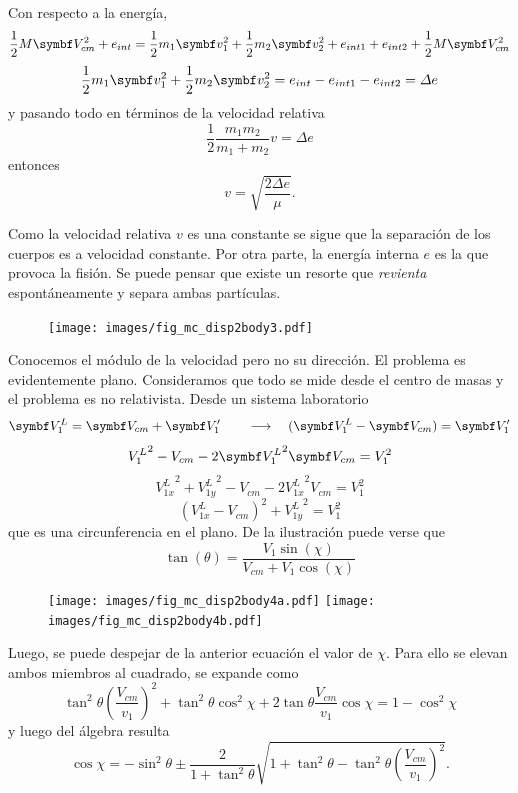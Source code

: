 \documentclass[10pt,oneside]{CBFT_book}
\begin{document}
Con respecto a la energía,
\[
	\frac{1}{2} M \vb{V}_{cm}^2 + e_{int} = \frac{1}{2} m_1 \vb{v}_1^2 + \frac{1}{2} m_2 \vb{v}_2^2
						+ e_{int 1 } + e_{int 2} + \frac{1}{2} M \vb{V}_{cm}^2
\]
\[
	\frac{1}{2} m_1 \vb{v}_1^2 + \frac{1}{2} m_2 \vb{v}_2^2 = e_{int} - e_{int 1 } - e_{int 2} = \Delta e
\]
y pasando todo en términos de la velocidad relativa
\[
	 \frac{1}{2} \frac{m_1 m_2}{ m_1 + m_2 } v = \Delta e
\]
entonces 
\[
	v = \sqrt{\frac{ 2 \Delta e}{ \mu } }.
\]

Como la velocidad relativa $v$ es una constante se sigue que la separación de los cuerpos es a
velocidad constante.
Por otra parte, la energía interna $e$ es la que provoca la fisión. Se puede pensar que existe un
resorte que {\it revienta} espontáneamente y separa ambas partículas.

\begin{figure}[htb]
	\begin{center}
	\texttt{[image: images/fig\_mc\_disp2body3.pdf]}	 
	\end{center}
	\caption{}
\end{figure} 

Conocemos el módulo de la velocidad pero no su dirección.
El problema es evidentemente plano. Consideramos que todo se mide desde el centro de masas y el
problema es no relativista.
Desde un sistema laboratorio 
\[
	\vb{V}_1^L =  \vb{V}_{cm} + \vb{V}_1' \qquad \longrightarrow \quad ( \vb{V}_1^L - \vb{V}_{cm} ) = \vb{V}_1'
\]
\[
	{V_1^L}^2 - V_{cm} - 2 {\vb{V}_1^L}^2 \vb{V}_{cm} = V_1^2
\]
\[
	{V_{1x}^L}^2 + {V_{1y}^L}^2 - V_{cm} - 2 {V_{1x}^L}^2 V_{cm} = V_1^2
\]
\[
	( V_{1x}^L  - V_{cm} )^2 + {V_{1y}^L}^2 = V_1^2
\]
que es una circunferencia en el plano.
De la ilustración puede verse que 
\[
	\tan(\theta) = \frac{V_1 \sin(\chi) }{ V_{cm} + V_1 \cos(\chi) }
\]
\begin{figure}[htb]
	\begin{center}
	\texttt{[image: images/fig\_mc\_disp2body4a.pdf]}	 
	\texttt{[image: images/fig\_mc\_disp2body4b.pdf]}
	\end{center}
	\caption{}
\end{figure} 

Luego, se puede despejar de la anterior ecuación el valor de $\chi$. Para ello se elevan
ambos miembros al cuadrado, se expande como 
\[
	\tan^2 \theta \left( \frac{V_{cm}}{v_1} \right)^2 +
	\tan^2 \theta \cos^2 \chi + 2 \tan \theta \frac{V_{cm}}{v_1} \cos \chi = 1 - \cos^2 \chi
\]
y luego del álgebra resulta 
\[
	\cos \chi = - \sin^2 \theta \pm \frac{2}{1+\tan^2\theta} 
	\sqrt{ 1 + \tan^2 \theta - \tan^2 \theta \left( \frac{V_{cm}}{v_1} \right)^2 }.
\]
\end{document}
